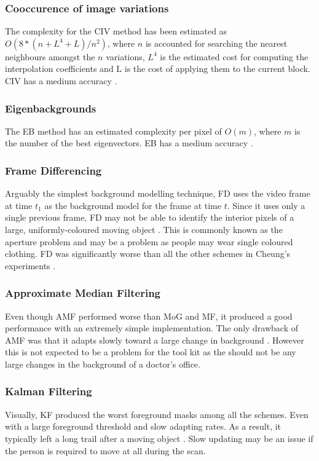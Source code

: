 \subsubsection{Cooccurence of image variations}
The complexity for the CIV \cite{Seki2003} method has been
estimated as $O(8*(n+L^4+L)/n^2)$, where $n$ is accounted for searching the nearest neighbours amongst the $n$ variations, $L^4$ is the estimated cost for computing the interpolation coefficients and L is the cost of applying them to the current block. CIV has a medium accuracy \cite{Piccardi2004}.\\

\subsubsection{Eigenbackgrounds}
The EB method \cite{Oliver2000} has an estimated complexity per pixel of $O(m)$, where $m$ is the number of the best eigenvectors. EB has a medium accuracy \cite{Piccardi2004}.\\

\subsubsection{Frame Differencing}
Arguably the simplest background modelling technique, FD uses the video frame at time $t_1$ as the background model for the frame at time $t$. Since it uses only
a single previous frame, FD may not be able to identify the interior pixels of a large, uniformly-coloured moving object \cite{Cheung2007}. This is commonly known as the aperture problem and may be a problem as people may wear single coloured clothing. FD was significantly worse than all the other schemes in Cheung's experiments \cite{Cheung2007}.

\subsubsection{Approximate Median Filtering} 
Even though AMF performed worse than MoG and MF, it produced a good performance with an extremely simple implementation. The only drawback of AMF was that it adapts slowly toward a large change in background \cite{Cheung2007}. However this is not expected to be a problem for the tool kit as the should not be any large changes in the background of a doctor's office.\\

\subsubsection{Kalman Filtering}
Visually, KF produced the worst foreground masks among all the schemes. Even with a large foreground threshold and slow adapting rates. As a result, it typically left a long trail after a moving object \cite{Cheung2007}. Slow updating may be an issue if the  person is required to move at all during the scan.\\

